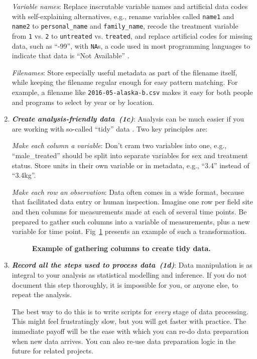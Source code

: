 \documentclass[10pt,letterpaper]{article}
\newcommand{\practice}[2]{\textbf{\emph{{#2}~({#1})}}}
\begin{document}
\begin{enumerate}
  \emph{Variable names}: Replace inscrutable variable names
  and artificial data codes with self-explaining alternatives, e.g.,
  rename variables called \texttt{name1} and \texttt{name2} to
  \texttt{personal\_name} and \texttt{family\_name}, recode the
  treatment variable from \texttt{1} vs.  \texttt{2} to
  \texttt{untreated} vs. \texttt{treated}, and replace artificial
  codes for missing data, such as ``-99'', with \texttt{NA}s,
  a code used in most programming languages to indicate that data is ``Not Available''
  \cite{white2013}.

  \emph{Filenames}: Store especially useful metadata as part of the filename itself, while
  keeping the filename regular enough for easy pattern matching. For example, a filename
  like \texttt{2016-05-alaska-b.csv} makes it easy for both people and programs to select
  by year or by location.

\item
  \practice{1c}{Create analysis-friendly data}: Analysis can be much easier if you are
  working with so-called ``tidy'' data \cite{wickham2014}. Two key principles are:

  \emph{Make each column a variable}: Don't cram two variables into one, e.g.,
  ``male\_treated'' should be split into separate variables for sex and treatment status.
  Store units in their own variable or in metadata, e.g., ``3.4'' instead of ``3.4kg''.

  \emph{Make each row an observation}: Data often comes in a wide format, because that
  facilitated data entry or human inspection. Imagine one row per field site and then
  columns for measurements made at each of several time points. Be prepared to gather such
  columns into a variable of measurements, plus a new variable for time point.
  Fig~\ref{fig:tidy} presents an example of such a transformation.

  \begin{figure} %
    \caption{\textbf{Example of gathering columns to create tidy data.}}
    \label{fig:tidy}
  \end{figure}

\item
  \practice{1d}{Record all the steps used to process data}: Data manipulation is as integral
  to your analysis as statistical modelling and inference. If you do not document this
  step thoroughly, it is impossible for you, or anyone else, to repeat the analysis.

  The best way to do this is to write scripts for \emph{every} stage of data processing.
  This might feel frustratingly slow, but you will get faster with practice. The
  immediate payoff will be the ease with which you can re-do data preparation when new
  data arrives. You can also re-use data preparation logic in the future for related
  projects.


\end{enumerate}
\end{document}
